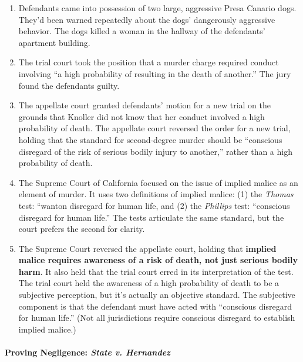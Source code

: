 \begin{enumerate}
    \item Defendants came into possession of two large, aggressive Presa Canario dogs. They'd been warned repeatedly about the dogs' dangerously aggressive behavior. The dogs killed a woman in the hallway of the defendants' apartment building.
    \item The trial court took the position that a murder charge required conduct involving ``a high probability of resulting in the death of another.'' The jury found the defendants guilty.
    \item The appellate court granted defendants' motion for a new trial on the grounds that Knoller did not know that her conduct involved a high probability of death. The appellate court reversed the order for a new trial, holding that the standard for second-degree murder should be ``conscious disregard of the risk of serious bodily injury to another,'' rather than a high probability of death.
    \item The Supreme Court of California focused on the issue of implied malice as an element of murder. It uses two definitions of implied malice: (1) the \emph{Thomas} test: ``wanton disregard for human life, and (2) the \emph{Phillips} test: ``conscious disregard for human life.'' The tests articulate the same standard, but the court prefers the second for clarity.
    \item The Supreme Court reversed the appellate court, holding that \textbf{implied malice requires awareness of a risk of death, not just serious bodily harm}. It also held that the trial court erred in its interpretation of the test. The trial court held the awareness of a high probability of death to be a subjective perception, but it's actually an objective standard. The subjective component is that the defendant must have acted with ``conscious disregard for human life.'' (Not all jurisdictions require conscious disregard to establish implied malice.)
\end{enumerate}

\paragraph{Proving Negligence: \emph{State v. Hernandez}}

